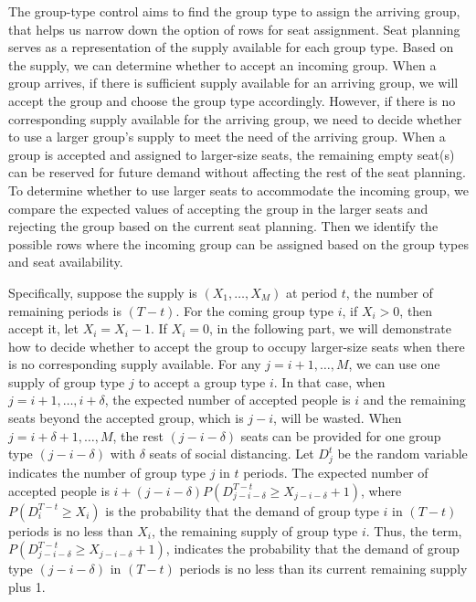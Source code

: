 The group-type control aims to find the group type to assign the arriving group, that helps us narrow down the option of rows for seat assignment. Seat planning serves as a representation of the supply available for each group type. Based on the supply, we can determine whether to accept an incoming group. When a group arrives, if there is sufficient supply available for an arriving group, we will accept the group and choose the group type accordingly. However, if there is no corresponding supply available for the arriving group, we need to decide whether to use a larger group's supply to meet the need of the arriving group. When a group is accepted and assigned to larger-size seats, the remaining empty seat(s) can be reserved for future demand without affecting the rest of the seat planning. To determine whether to use larger seats to accommodate the incoming group, we compare the expected values of accepting the group in the larger seats and rejecting the group based on the current seat planning. Then we identify the possible rows where the incoming group can be assigned based on the group types and seat availability.


Specifically, suppose the supply is $(X_1, \ldots, X_M)$ at period $t$, the number of remaining periods is $(T-t)$. For the coming group type $i$, if $X_i > 0$, then accept it, let $X_i = X_i -1$.
If $X_i = 0$, in the following part, we will demonstrate how to decide whether to accept the group to occupy larger-size seats when there is no corresponding supply available. For any $j=i+1, \ldots, M$, we can use one supply of group type $j$ to accept a group type $i$. In that case, when $j = i+1, \ldots, i+\delta$, the expected number of accepted people is $i$ and the remaining seats beyond the accepted group, which is $j-i$, will be wasted. When $j = i+\delta+1, \ldots, M$, the rest $(j-i-\delta)$ seats can be provided for one group type $(j-i-\delta)$ with $\delta$ seats of social distancing. Let $D_j^{t}$ be the random variable indicates the number of group type $j$ in $t$ periods. The expected number of accepted people is $i + (j-i-\delta)P(D_{j-i-\delta}^{T-t} \geq X_{j-i-\delta}+1)$, where $P(D_i^{T-t} \geq X_i)$ is the probability that the demand of group type $i$ in $(T-t)$ periods is no less than $X_i$, the remaining supply of group type $i$. Thus, the term, $P(D_{j-i-\delta}^{T-t} \geq X_{j-i-\delta}+1)$, indicates the probability that the demand of group type $(j-i-\delta)$ in $(T-t)$ periods is no less than its current remaining supply plus 1. 

